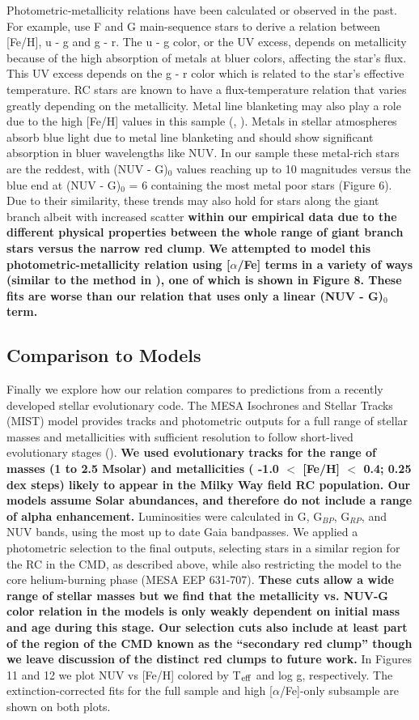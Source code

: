 \documentclass[twocolumn]{emulateapj}
\begin{document}
Photometric-metallicity relations have been calculated or observed in the past. For example, \citealt{ivezic2008} use F and G main-sequence stars to derive a relation between [Fe/H], u - g and g - r. The u - g color, or the UV excess, depends on metallicity because of the high absorption of metals at bluer colors, affecting the star's flux. This UV excess depends on the g - r color which is related to the star's effective temperature. RC stars are known to have a flux-temperature relation that varies greatly depending on the metallicity. Metal line blanketing may also play a role due to the high [Fe/H] values in this sample (\citealt{girardi16}, \citealt{choi16}). Metals in stellar atmospheres absorb blue light due to metal line blanketing and should show significant absorption in bluer wavelengths like NUV. In our sample these metal-rich stars are the reddest, with (NUV - G)$_0$ values reaching up to 10 magnitudes versus the blue end at (NUV - G)$_0$ = 6 containing the most metal poor stars (Figure 6). Due to their similarity, these trends may also hold for stars along the giant branch albeit with increased scatter \textbf{within our empirical data due to the different physical properties between the whole range of giant branch stars versus the narrow red clump}. \textbf{We attempted to model this photometric-metallicity relation using [$\alpha$/Fe] terms in a variety of ways (similar to the method in \citealt{ivezic2008}), one of which is shown in Figure 8. These fits are worse than our relation that uses only a linear (NUV - G)$_0$ term.}

\subsection{Comparison to Models}
Finally we explore how our relation compares to predictions from a recently developed stellar evolutionary code. The MESA Isochrones and Stellar Tracks (MIST) model provides tracks and photometric outputs for a full range of stellar masses and metallicities with sufficient resolution to follow short-lived evolutionary stages (\citealt{choi16}). {\bf We used evolutionary tracks for the range of masses (1 to 2.5 Msolar) and metallicities ( -1.0 $<$ [Fe/H] $<$ 0.4; 0.25 dex steps) likely to appear in the Milky Way field RC population. Our models assume Solar abundances, and therefore do not include a range of alpha enhancement.} Luminosities were calculated in G, G$_{BP}$, G$_{RP}$, and NUV bands, using the most up to date Gaia bandpasses. We applied a photometric selection to the final outputs, selecting stars in a similar region for the RC in the CMD, as described above, while also restricting the model to the core helium-burning phase (MESA EEP 631-707). {\bf These cuts allow a wide range of stellar masses but we find that the metallicity vs. NUV-G color relation in the models is only weakly dependent on initial mass and age during this stage. Our selection cuts also include at least part of the region of the CMD known as the ``secondary red clump'' though we leave discussion of the distinct red clumps to future work.} In Figures 11 and 12 we plot NUV vs [Fe/H] colored by T$_{\rm{eff}}$ and log g, respectively. The extinction-corrected fits for the full sample and high [$\alpha$/Fe]-only subsample are shown on both plots.
\end{document}
